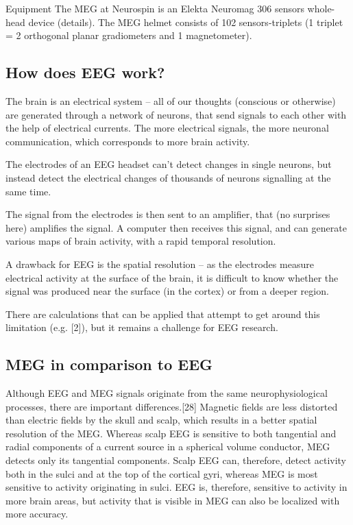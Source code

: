 Equipment
The MEG at Neurospin is an Elekta Neuromag 306 sensors whole-head device (details). The MEG helmet consists of 102 sensors-triplets (1 triplet = 2 orthogonal planar gradiometers and 1 magnetometer).


\subsection{How does EEG work?}

The brain is an electrical system – all of our thoughts (conscious or otherwise) are generated through a network of neurons, that send signals to each other with the help of electrical currents. The more electrical signals, the more neuronal communication, which corresponds to more brain activity.

The electrodes of an EEG headset can’t detect changes in single neurons, but instead detect the electrical changes of thousands of neurons signalling at the same time.

The signal from the electrodes is then sent to an amplifier, that (no surprises here) amplifies the signal. A computer then receives this signal, and can generate various maps of brain activity, with a rapid temporal resolution.

A drawback for EEG is the spatial resolution – as the electrodes measure electrical activity at the surface of the brain, it is difficult to know whether the signal was produced near the surface (in the cortex) or from a deeper region.

There are calculations that can be applied that attempt to get around this limitation (e.g. [2]), but it remains a challenge for EEG research.

\subsection{MEG in comparison to EEG}
Although EEG and MEG signals originate from the same neurophysiological processes, there are important differences.[28] Magnetic fields are less distorted than electric fields by the skull and scalp, which results in a better spatial resolution of the MEG. Whereas scalp EEG is sensitive to both tangential and radial components of a current source in a spherical volume conductor, MEG detects only its tangential components. Scalp EEG can, therefore, detect activity both in the sulci and at the top of the cortical gyri, whereas MEG is most sensitive to activity originating in sulci. EEG is, therefore, sensitive to activity in more brain areas, but activity that is visible in MEG can also be localized with more accuracy.

